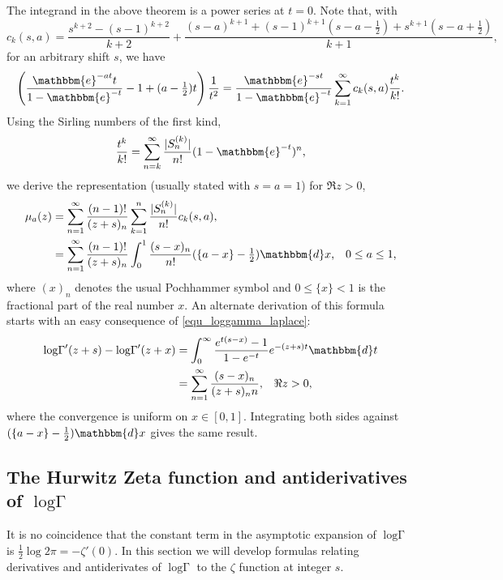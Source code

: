 \documentclass[12pt]{article}
\newcommand{\ee}[0] {\mathbbm{e}}
\newcommand{\dd}[0] {\mathbbm{d}}
\newcommand{\logG} {\operatorname {log \Gamma}}
\numberwithin{equation}{section}
\begin{document}
The integrand in the above theorem is a power series at $t=0$. Note that, with
\begin{equation*}
c_k(s,a)=\frac{s^{k+2}-(s-1)^{k+2}}{k+2}+\frac{(s-a)^{k+1}+(s-1)^{k+1}(s-a-\frac{1}{2}) +s^{k+1}(s-a+\frac{1}{2})}{k+1}\text{,}
\end{equation*}
for an arbitrary shift $s$, we have
\begin{equation*}
\left( \frac{ \ee^{-at}t}{1-\ee^{-t}}-1+(a-\tfrac{1}{2})t \right) \frac{1}{t^2} = \frac{\ee^{-s t}}{1-\ee^{-t}} \sum_{k=1}^{\infty} c_k(s,a) \frac{t^k}{k!}\text{.}
\end{equation*}
Using the Sirling numbers of the first kind,
\begin{equation*}
\frac{t^k}{k!} = \sum_{n=k}^{\infty} \frac{| S_n^{(k)}|}{n!} (1-\ee^{-t})^n\text{,}
\end{equation*}
we derive the representation (usually stated with $s=a=1$) for $\Re z > 0$,
\begin{align*}
\mu_a(z) &= \sum_{n=1}^{\infty}\frac{(n-1)!}{(z+s)_n} \sum_{k=1}^{n}\frac{|S_n^{(k)}|}{n!} c_k(s,a) \text{,}\\
&= \sum_{n=1}^{\infty}\frac{(n-1)!}{(z+s)_n} \int_0^1 \frac{(s-x)_n}{n!}  (\{a-x\}-\tfrac{1}{2}) \dd x\text{,} \quad 0 \le a \le 1\text{,}
\end{align*}
where $(x)_n$ denotes the usual Pochhammer symbol and $0 \le \{x\} < 1$ is the fractional part of the real number $x$. An alternate derivation of this formula starts with an easy consequence of \eqref{equ_loggamma_laplace}:
\begin{align*}
\logG'(z+s) - \logG'(z+x) &= \int_{0}^{\infty} \frac{e^{t \left(s-x\right)}-1}{1-e^{-t}} e^{-(z+s)t} \dd t\\
&= \sum_{n=1}^{\infty} \frac{(s-x)_n}{(z+s)_n n} \text{,} \quad \Re z > 0 \text{,}
\end{align*}
where the convergence is uniform on $x \in [0,1]$. Integrating both sides against $(\{a-x\}-\tfrac{1}{2}) \dd x$ gives the same result.

\subsection{The Hurwitz Zeta function and antiderivatives of $\logG$}
It is no coincidence that the constant term in the asymptotic expansion of $\logG$ is $\tfrac{1}{2} \log2\pi = -\zeta'(0)$. In this section we will develop formulas relating derivatives and antiderivates of $\logG$ to the $\zeta$ function at integer $s$.
\end{document}
